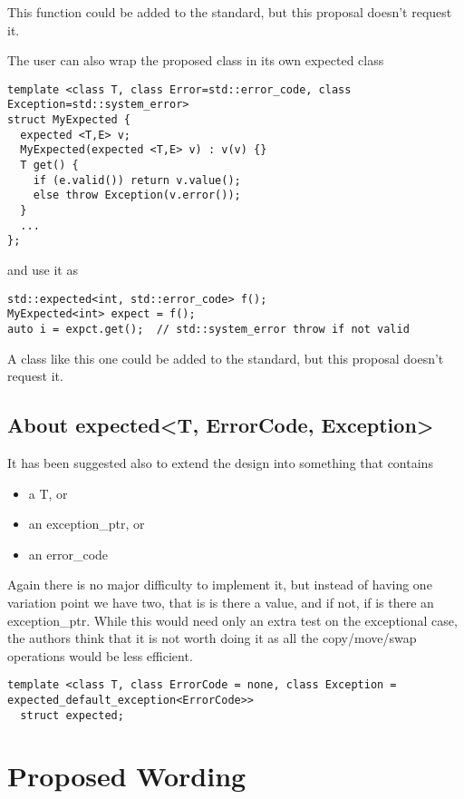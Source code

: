 \documentclass[a4paper,10pt]{article}
\begin{document}
This function could be added to the standard, but this proposal doesn't request it. 

The user can also wrap the proposed class in its own expected class

\begin{lstlisting}
template <class T, class Error=std::error_code, class Exception=std::system_error>
struct MyExpected {
  expected <T,E> v;
  MyExpected(expected <T,E> v) : v(v) {}
  T get() {  
    if (e.valid()) return v.value();
    else throw Exception(v.error());
  }
  ...
};
\end{lstlisting}

and use it as

\begin{lstlisting}
std::expected<int, std::error_code> f();
MyExpected<int> expect = f();
auto i = expct.get();  // std::system_error throw if not valid
\end{lstlisting}

A class like this one could be added to the standard, but this proposal doesn't request it. 

\subsection{About expected<T, ErrorCode, Exception>}

It has been suggested also to extend the design into something that contains 

\begin{itemize}
\item a T, or
\item an exception_ptr, or 
\item an error_code
\end{itemize}

Again there is no major difficulty to implement it, but instead of having one variation point we have two, that is is there a value, and if not, if is there an exception_ptr. While this would need only an extra test on the exceptional case, the authors think that it is not worth doing it as all the copy/move/swap operations would be less efficient.  

\begin{lstlisting}
template <class T, class ErrorCode = none, class Exception = expected_default_exception<ErrorCode>>
  struct expected;
\end{lstlisting}

\section{Proposed Wording}
\end{document}
